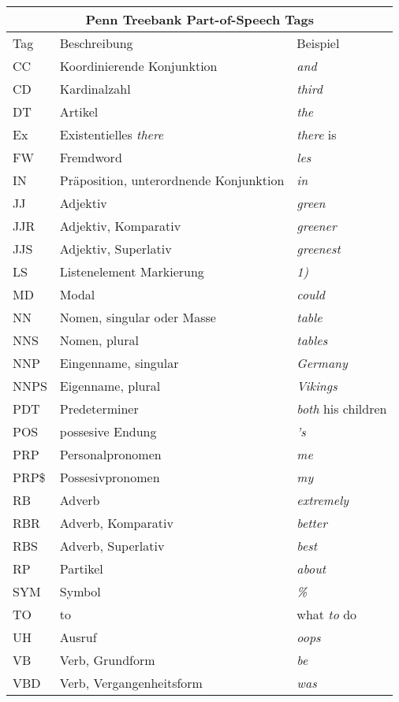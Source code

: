 \begin{table}
\begin{tabular}{ | l l l |}
	\hline
	\multicolumn{3}{|c|}{Penn Treebank Part-of-Speech Tags} \\
	\hline
	\hline
	Tag & Beschreibung & Beispiel \\
	\hline
	CC & Koordinierende Konjunktion & \textit{and} \\
	CD & Kardinalzahl & \textit{third}\\
	DT & Artikel & \textit{the}\\
	Ex & Existentielles \textit{there} & \textit{there} is\\
	FW & Fremdword & \textit{les}\\
	IN & Präposition, unterordnende Konjunktion & \textit{in}\\
	JJ & Adjektiv & \textit{green}\\
	JJR & Adjektiv, Komparativ & \textit{greener}\\
	JJS & Adjektiv, Superlativ & \textit{greenest}\\
	LS & Listenelement Markierung & \textit{1)}\\
	MD & Modal & \textit{could}\\
	NN & Nomen, singular oder Masse & \textit{table}\\
	NNS & Nomen, plural & \textit{tables}\\
	NNP & Eingenname, singular & \textit{Germany}\\
	NNPS & Eigenname, plural & \textit{Vikings}\\
	PDT & Predeterminer & \textit{both} his children \\
	POS & possesive Endung & \textit{'s} \\
	PRP & Personalpronomen & \textit{me} \\
	PRP\$ & Possesivpronomen & \textit{my} \\
	RB & Adverb & \textit{extremely} \\
	RBR & Adverb, Komparativ & \textit{better} \\
	RBS & Adverb, Superlativ & \textit{best} \\
	RP & Partikel & \textit{about} \\
	SYM & Symbol & \textit{\%} \\
	TO & to & what \textit{to} do \\
	UH & Ausruf & \textit{oops} \\
	VB & Verb, Grundform & \textit{be} \\
	VBD & Verb, Vergangenheitsform & \textit{was} \\

\end{tabular}
\end{table}
